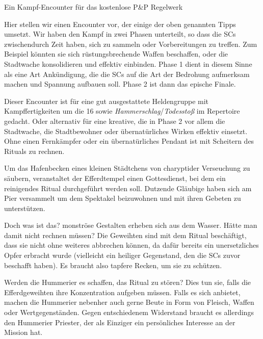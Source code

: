 \spaltenende

\vfill

\begin{flushright}
\end{flushright}

\neueseite

\begin{center}
    Ein Kampf-Encounter für das kostenlose P\&P Regelwerk {}
\end{center}
\spaltenanfang

Hier stellen wir einen Encounter vor, der einige der oben genannten Tipps umsetzt.
Wir haben den Kampf in zwei Phasen unterteilt, so dass die SCs zwischendurch Zeit haben, sich zu sammeln oder Vorbereitungen zu treffen.
Zum Beispiel könnten sie sich rüstungsbrechende Waffen beschaffen, oder die Stadtwache konsolidieren und effektiv einbinden.
Phase 1 dient in diesem Sinne als eine Art Ankündigung, die die SCs auf die Art der Bedrohung aufmerksam machen und Spannung aufbauen soll.
Phase 2 ist dann das epische Finale. 

Dieser Encounter ist für eine gut ausgestattete Heldengruppe mit Kampffertigkeiten um die 16 sowie \textit{Hammerschlag}/\textit{Todesstoß} im Repertoire gedacht.
Oder alternativ für eine kreative, die in Phase 2 vor allem die Stadtwache, die Stadtbewohner oder übernatürliches Wirken effektiv einsetzt.
Ohne einen Fernkämpfer oder ein übernatürliches Pendant ist mit Scheitern des Rituals zu rechnen.


Um das Hafenbecken eines kleinen Städtchens von charyptider Verseuchung zu säubern, veranstaltet der Efferdtempel einen Gottesdienst, bei dem ein reinigendes Ritual durchgeführt werden soll.
Dutzende Gläubige haben sich am Pier versammelt um dem Spektakel beizuwohnen und mit ihren Gebeten zu unterstützen.

Doch was ist das? monströse Gestalten erheben sich aus dem Wasser. Hätte man damit nicht rechnen müssen? Die Geweihten sind mit dem Ritual beschäftigt, dass sie nicht ohne weiteres abbrechen können, da dafür bereits ein unersetzliches Opfer erbracht wurde (vielleicht ein heiliger Gegenstand, den die SCs zuvor beschafft haben).
Es braucht also tapfere Recken, um sie zu schützen.

Werden die Hummerier es schaffen, das Ritual zu stören? Dies tun sie, falls die Efferdgeweihten ihre Konzentration aufgeben müssen. Falls es sich anbietet, machen die Hummerier nebenher auch gerne Beute in Form von Fleisch, Waffen oder Wertgegenständen. Gegen entschiedenem Widerstand braucht es allerdings den Hummerier Priester, der als Einziger ein persönliches Interesse an der Mission hat.

